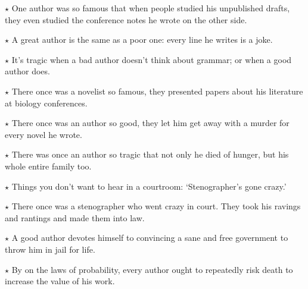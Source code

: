 \documentclass[oneside]{book}
\begin{document}


$\star$ One author was so famous that when people studied his
unpublished drafts, they even studied the conference notes
he wrote on the other side.

$\star$ A great author is the same as a poor one: every line he writes is a joke.

$\star$ It's tragic when a bad author doesn't think about grammar; or when a
good author does.

$\star$ There once was a novelist so famous, they presented papers about
his literature at biology conferences.


$\star$ There once was an author so good, they let him get away with
a murder for every novel he wrote.

$\star$ There was once an author so tragic that not only he died of hunger,
but his whole entire family too.


$\star$ Things you don't want to hear in a courtroom: `Stenographer's gone crazy.'

$\star$ There once was a stenographer who went crazy in court.  They took his
ravings and rantings and made them into law.



$\star$ A good author
devotes himself to convincing a sane
and free government to throw him in jail for life.

$\star$ By on the laws of probability, every author ought to repeatedly risk
death to increase the value of his work.
\end{document}
